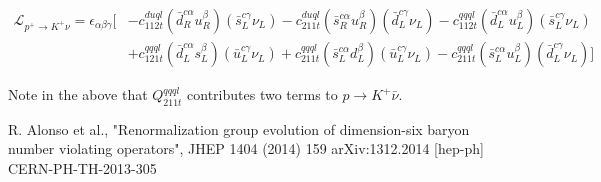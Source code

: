 \documentclass[aps,onecolumn,twoside,secnumarabic,balancelastpage,amsmath,amssymb,nofootinbib,hyperref=pdftex]{revtex4}
\begin{document}
\begin{align}
\mathcal{L}_{p^{+}\rightarrow K^{+}\nu} = \epsilon_{\alpha\beta\gamma}[&-c^{duql}_{112t}(\bar{d}_{R}^{c\alpha}u_{R}^{\beta})(\bar{s}_{L}^{c\gamma}\nu_{L}) - c^{duql}_{211t}(\bar{s}_{R}^{c\alpha}u_{R}^{\beta})(\bar{d}_{L}^{c\gamma}\nu_{L}) - c^{qqql}_{112t}(\bar{d}_{L}^{c\alpha}u_{L}^{\beta})(\bar{s}_{L}^{c\gamma}\nu_{L})\nonumber \\
&+ c^{qqql}_{121t}(\bar{d}^{c\alpha}_{L}s^{\beta}_{L})(\bar{u}^{c\gamma}_{L}\nu_{L}) + c^{qqql}_{211t}(\bar{s}^{c\alpha}_{L}d^{\beta}_{L})(\bar{u}^{c\gamma}_{L}\nu_{L}) - c^{qqql}_{211t}(\bar{s}^{c\alpha}_{L}u^{\beta}_{L})(\bar{d}^{c\gamma}_{L}\nu_{L})]
\end{align}

Note in the above that $Q^{qqql}_{211t}$ contributes two terms to $p\rightarrow K^{+}\bar{\nu}$.
 
\begin{thebibliography}{9}

R. Alonso et al.,  "Renormalization group evolution of dimension-six
baryon number violating operators", JHEP 1404 (2014) 159 arXiv:1312.2014 [hep-ph] CERN-PH-TH-2013-305

\end{thebibliography}
\end{document}
